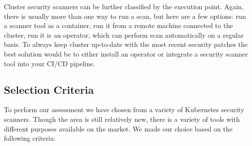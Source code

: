 Cluster security scanners can be further classified by the execution point. Again, there is usually more than one way to run a scan, but here are a few options: run a scanner tool as a container, run it from a remote machine connected to the cluster, run it is an operator, which can perform scan automatically on a regular basis. To always keep cluster up-to-date with the most recent security patches the best solution would be to either install an operator or integrate a security scanner tool into your CI/CD pipeline.

\subsection{Selection Criteria}

To perform our assessment we have chosen from a variety of Kubernetes security scanners. Though the area is still relatively new, there is a variety of tools with different purposes available on the market. We made our choice based on the following criteria:
